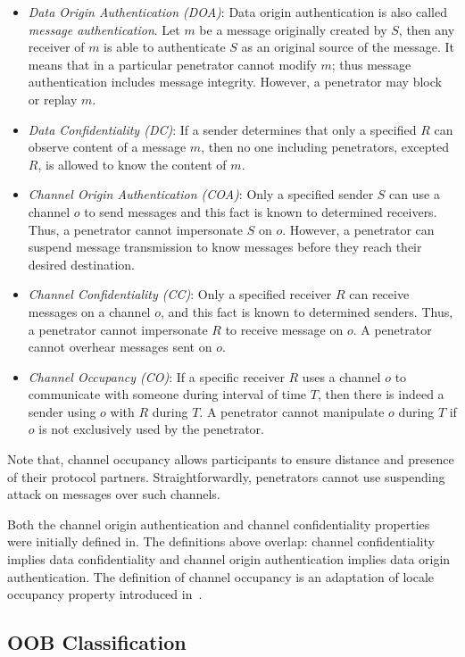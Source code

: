 \begin{itemize}
\item \emph{Data Origin Authentication (DOA)}: Data origin authentication is also called \emph{message authentication}. Let $m$ be a message originally created by $S$, then any receiver of $m$ is able to authenticate $S$ as an original source of the message. It means that in a particular penetrator cannot modify $m$; thus message authentication includes message integrity. However, a penetrator may block or replay $m$. 
\item \emph{Data Confidentiality (DC)}: If a sender determines that only a specified $R$ can observe content of a message $m$, then no one including penetrators, excepted $R$, is allowed to know the content of $m$.
\item \emph{Channel Origin Authentication (COA)}: Only a specified sender $S$ can use a channel $o$ to send messages and this fact is known to determined receivers. Thus, a penetrator cannot impersonate $S$ on $o$. However, a penetrator can suspend message transmission to know messages before they reach their desired destination. 
\item \emph{Channel Confidentiality (CC)}: Only a specified receiver $R$ can receive messages on a channel $o$, and this fact is known to determined senders. Thus, a penetrator cannot impersonate $R$ to receive message on $o$. A penetrator cannot overhear messages sent on $o$.
\item \emph{Channel Occupancy (CO)}: If a specific receiver $R$ uses a channel $o$ to communicate with someone during interval of time $T$, then there is indeed a sender using $o$ with $R$ during $T$. A penetrator cannot manipulate $o$ during $T$ if $o$ is not exclusively used by the penetrator.
\end{itemize} 

Note that, channel occupancy allows participants to ensure distance and presence of their protocol partners. Straightforwardly, penetrators cannot use suspending attack on messages over such channels.

Both the channel origin authentication and channel confidentiality properties were initially defined in\cite{Mausch94}. The definitions above overlap: channel confidentiality implies data confidentiality and channel origin authentication implies data origin authentication. The definition of channel occupancy is an adaptation of locale occupancy property introduced in~\cite{Thayer:2010aa}.

\subsection{OOB Classification}

